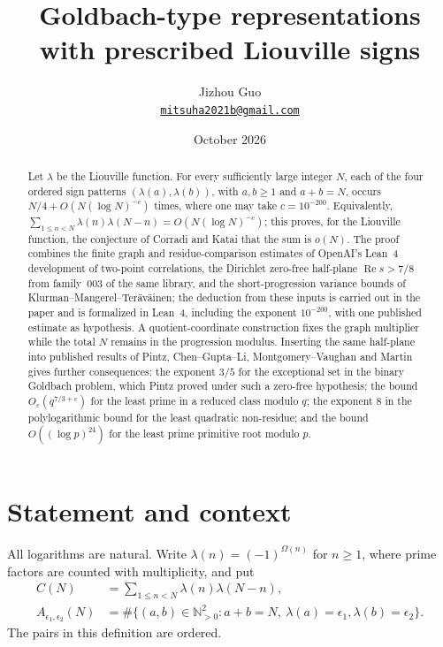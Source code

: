 \documentclass[11pt]{article}
\title{Goldbach-type representations with prescribed Liouville signs}
\author{Jizhou Guo\\
  \href{mailto:mitsuha2021b@gmail.com}{\texttt{mitsuha2021b@gmail.com}}}
\date{October 2026}
\theoremstyle{definition}
\newcommand{\N}{\mathbb N}
\DeclareMathOperator{\Rea}{Re}
\begin{document}
\maketitle
\begin{abstract}
Let $\lambda$ be the Liouville function. For every sufficiently large
integer $N$, each of the four ordered sign patterns
$(\lambda(a),\lambda(b))$, with $a,b\ge1$ and $a+b=N$, occurs
$N/4+O(N(\log N)^{-c})$ times, where one may take $c=10^{-200}$.
Equivalently, $\sum_{1\le n<N}\lambda(n)\lambda(N-n)
=O(N(\log N)^{-c})$; this proves, for the Liouville function,
the conjecture of Corradi and Katai that the sum is $o(N)$.
The proof combines the finite graph and residue-comparison estimates
of OpenAI's Lean~4 development of two-point correlations, the
Dirichlet zero-free half-plane $\Rea s>7/8$ from family~003 of the
same library, and the short-progression
variance bounds of Klurman--Mangerel--Ter\"av\"ainen; the deduction from
these inputs is carried out in the paper and is formalized in Lean~4,
including the exponent $10^{-200}$, with one published estimate as
hypothesis. A quotient-coordinate
construction fixes the graph multiplier while the total $N$ remains
in the progression modulus. Inserting the same half-plane into published
results of Pintz, Chen--Gupta--Li, Montgomery--Vaughan and Martin gives
further consequences: the exponent $3/5$ for the exceptional set in the
binary Goldbach problem, which Pintz proved under such a zero-free
hypothesis; the bound $O_\varepsilon(q^{7/3+\varepsilon})$ for the least
prime in a reduced class modulo $q$; the exponent $8$ in the
polylogarithmic bound for the least quadratic non-residue; and the bound
$O((\log p)^{24})$ for the least prime primitive root modulo $p$.
\end{abstract}

\section{Statement and context}
All logarithms are natural. Write $\lambda(n)=(-1)^{\Omega(n)}$ for $n\ge1$,
where prime factors are counted with multiplicity, and put
\begin{align*}
 C(N)&=\sum_{1\le n<N}\lambda(n)\lambda(N-n),\\
 A_{\epsilon_1,\epsilon_2}(N)&=
 \#\{(a,b)\in\N_{>0}^2:a+b=N,\ \lambda(a)=\epsilon_1,
                                      \lambda(b)=\epsilon_2\}.
\end{align*}
The pairs in this definition are ordered.
\end{document}
